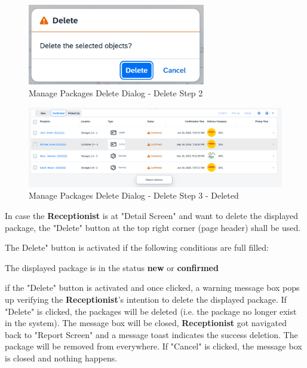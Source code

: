 \begin{figure}[H]
	\centering
	\includegraphics[height=100pt]{images/user_doc/managePack/ReportScreen/delete/deleteDlalog.png}
	\caption{Manage Packages Delete Dialog - Delete Step 2}
	\label{fig:MPReportDeleteDlg}
\end{figure}

\begin{figure}[H]
	\centering
	\includegraphics[height=100pt]{images/user_doc/managePack/ReportScreen/delete/deleteToast.png}
	\caption{Manage Packages Delete Dialog - Delete Step 3 - Deleted}
	\label{fig:MPReportDeleteDone}
\end{figure}


\bigskip
In case the \textbf{Receptionist} is at "Detail Screen" and want to delete the displayed package, the "Delete" button at the top right corner (page header) shall be used. 

The Delete" button is activated if the following conditions are full filled:

\begin{compactenum}
    \item The displayed package is in the status \textbf{new} or \textbf{confirmed}
\end{compactenum}

if the "Delete" button is activated and once clicked, a warning message box pops up verifying the \textbf{Receptionist}'s intention to delete the displayed package. If "Delete" is clicked, the packages will be deleted (i.e. the package no longer exist in the system). The message box will be closed, \textbf{Receptionist} got navigated back to "Report Screen" and a message toast indicates the success deletion. The package will be removed from everywhere. If "Cancel" is clicked, the message box is closed and nothing happens.

